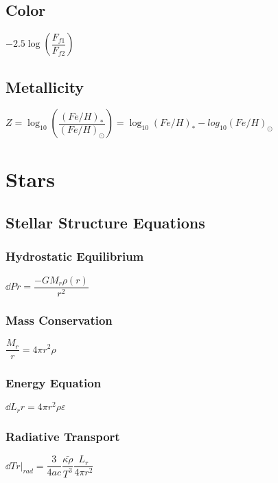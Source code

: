 \subsection{Color}			
\begin{itemize}
\itemt \( -2.5\log(\dfrac{F_{f1}}{F_{f2}}) \)
\end{itemize}			

\subsection{Metallicity}		
\begin{itemize}
\itemt \( Z = \log_{10}(\dfrac{(Fe/H)_*}{(Fe/H)_\odot}) = \log_{10}(Fe/H)_* - log_{10}(Fe/H)_\odot \)
\end{itemize}





	\section{Stars}


\subsection{Stellar Structure Equations}

\subsubsection{Hydrostatic Equilibrium}
\begin{itemize}
\itemt \( \dd{P}{r} = \dfrac{-G M_r \rho(r)}{r^2} \)
\end{itemize}

\subsubsection{Mass Conservation}
\begin{itemize}
\itemt \( \dfrac{M_r}{r} = 4 \pi r^2 \rho \)
\end{itemize}

\subsubsection{Energy Equation}
\begin{itemize}
\itemt \( \dd{L_r}{r} = 4 \pi r^2 \rho \varepsilon \)
\end{itemize}

\subsubsection{Radiative Transport}
\begin{itemize}
\itemt \( \dd{T}{r} |_{rad} = \dfrac{3}{4 a c} \dfrac{\bar{\kappa\rho}}{T^3} \dfrac{L_r}{4 \pi r^2} \)
\end{itemize}

